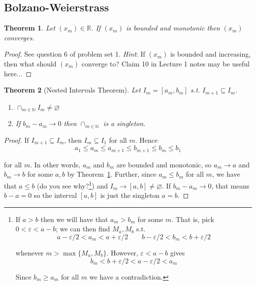 \documentclass{article}
\newcommand{\R}{\mathbb{R}}
\newcommand{\N}{\mathbb{N}}
\newtheorem{theorem}{Theorem}
\theoremstyle{definition}
\begin{document}
\subsection{Bolzano-Weierstrass}
\label{ssub:bolzano_weierstrass}

\begin{theorem}\label{thm:lecture2_bounded_mono_converge}
  Let $(x_m) \in \R$. If $(x_m)$ is bounded and monotonic then $(x_m)$ converges.
\end{theorem}
\begin{proof}
    See question 6 of problem set 1. \textit{Hint}: If $(x_m)$ is bounded and increasing, then what should $(x_m)$ converge to? Claim 10 in Lecture 1 notes may be useful here...
\end{proof}

\begin{theorem}[Nested Intervals Theorem]\label{thm:lecture2_nested_interval}
  Let $I_m = [a_m,  b_m]$ s.t. $I_{m + 1} \subseteq I_m$.
  \begin{enumerate}
    \item[a)] $\cap_{m \in \N} I_m \ne \varnothing$
    \item[b)] If $b_m - a_m \to 0$ then $\cap_{m \in \N}$ is  a singleton.
  \end{enumerate}
\end{theorem}

\begin{proof}
  If $I_{m + 1} \subseteq I_m$, then $I_{m} \subseteq I_1$ for all $m$. Hence
  \[
    a_1 \le a_m \le a_{m + 1} \le b_{m + 1} \le b_m \le b_1
  \]

  for all $m$. In other words, $a_m$ and $b_m$ are bounded and monotonic, so $a_m \to a$ and $b_m \to b$ for some $a, b$ by Theorem~\ref{thm:lecture2_bounded_mono_converge}. Further, since $a_m \le b_m$ for all $m$, we have that $a \le b$ (do you see why?\footnote{If $a > b$ then we will have that $a_m > b_m$ for some $m$. That is, pick $0 < \varepsilon < a - b$; we can then find $M_a, M_b$ s.t.
    \[
      a - \varepsilon / 2 < a_m < a + \varepsilon / 2
      \quad\quad
      b - \varepsilon / 2 < b_m < b + \varepsilon / 2
    \]

    whenever $m > \max\{M_a, M_b\}$. However, $\varepsilon < a - b$ gives
    \[
      b_m < b + \varepsilon / 2 < a - \varepsilon / 2 < a_m
    \]

    Since $b_m \ge a_m$ for all $m$ we have a contradiction.}) and $I_m \to [a, b] \ne \varnothing$. If $b_m - a_m \to 0$, that means $b - a = 0$ so the interval $[a, b]$ is just the singleton $a = b$.
\end{proof}
\end{document}
